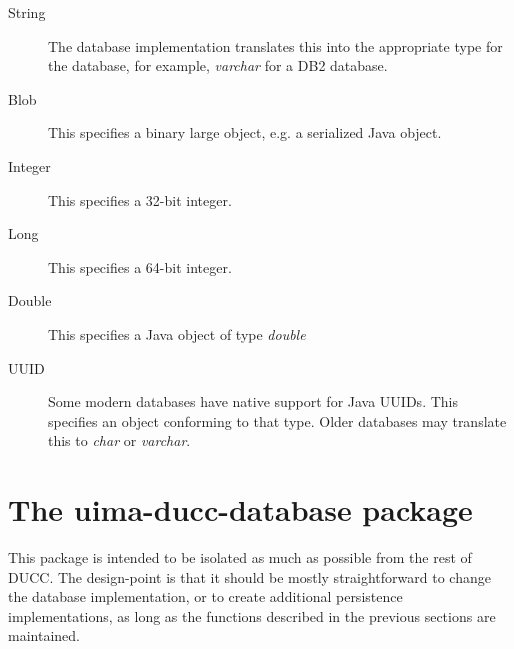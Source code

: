      \begin{description}
       \item[String] The database implementation translates this into the appropriate
         type for the database, for example, {\em varchar} for a DB2 database.
       \item[Blob] This specifies a binary large object, e.g. a serialized
         Java object.
       \item[Integer] This specifies a 32-bit integer.
       \item[Long] This specifies a 64-bit integer.
       \item[Double] This specifies a Java object of type {\em double}
       \item[UUID] Some modern databases have native support for Java UUIDs.  This specifies
         an object conforming to that type.  Older databases may translate this to {\em char}
         or {\em varchar}.
     \end{description}
     
\section{The uima-ducc-database package}
     This package is intended to be isolated as much as possible from the rest of DUCC.  The
     design-point is that it should be mostly straightforward to change the database implementation,
     or to create additional persistence implementations, as long as the functions described
     in the previous sections are maintained.

